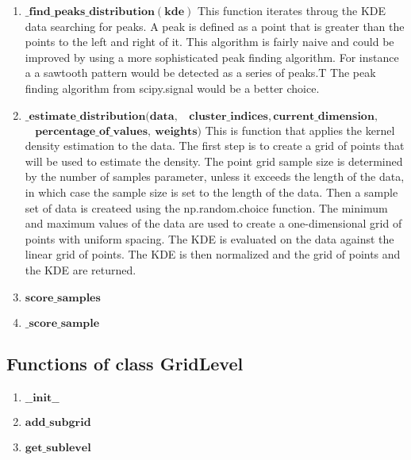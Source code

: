 \begin{enumerate}
    \item $\mathbf{\_find\_peaks\_distribution(kde)}$\newline
    {This function iterates throug the KDE data searching for peaks. A peak is defined as a point that is greater than the points to the left and right of it. 
    This algorithm is fairly naive and could be improved by using a more sophisticated peak finding algorithm. For instance a a sawtooth pattern would be detected as a series of peaks.T
    The peak finding algorithm from scipy.signal would be a better choice.}\newline
    \item $\mathbf{\_estimate\_distribution( data, }$\newline $\mathbf{~~~~ cluster\_indices, current\_dimension,}$\newline $\mathbf{~~~~  percentage\_of\_values,~weights )}$\newline
    {This is function that applies the kernel density estimation to the data. The first step is to create a grid of points that will be used to estimate the density. 
    The point grid sample size is determined by the number of samples parameter, unless it exceeds the length of the data, in which case the sample size is set to the length of the data.
    Then a sample set of data is createed using the np.random.choice function. The minimum and maximum values of the data are used to create a one-dimensional grid of points with uniform spacing.
    The KDE is evaluated on the data against the linear grid of points. The KDE is then normalized and the grid of points and the KDE are returned.}
    \item $\mathbf{score\_samples}$\newline
    {}
    \item $\mathbf{\_score\_sample}$\newline
    {}
\end{enumerate}

\subsection{Functions of class GridLevel}
\begin{enumerate}    
    \item $\mathbf{\_\_init\_\_}$\newline
    {}
    \item $\mathbf{add\_subgrid}$\newline
    {}
    \item $\mathbf{get\_sublevel}$\newline
    {}
\end{enumerate}


